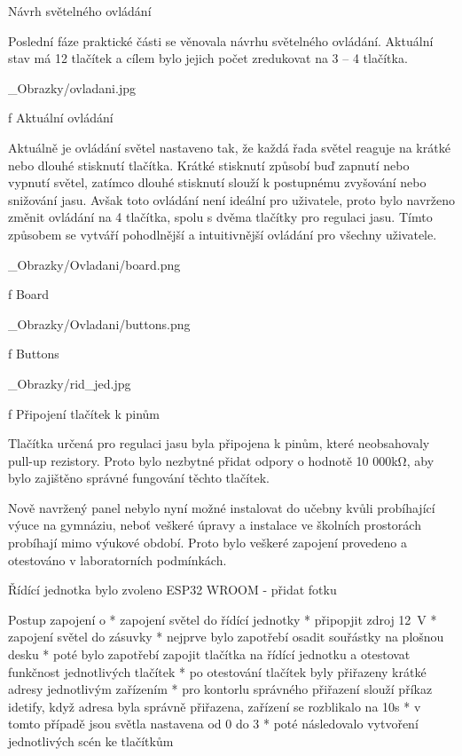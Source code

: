 \chap Návrh světelného ovládání


Poslední fáze praktické části se věnovala návrhu světelného ovládání. Aktuální stav má 12 tlačítek a
cílem bylo jejich počet zredukovat na 3 -- 4 tlačítka.

\medskip {}
\picw=10cm _Obrazky/ovladani.jpg
\caption/f Aktuální ovládání
\medskip


Aktuálně je ovládání světel nastaveno tak, že každá řada světel reaguje na krátké nebo dlouhé stisknutí tlačítka.
Krátké stisknutí způsobí buď zapnutí nebo vypnutí světel, zatímco dlouhé stisknutí slouží k postupnému zvyšování nebo snižování jasu.
Avšak toto ovládání není ideální pro uživatele, proto bylo navrženo změnit ovládání na 4 tlačítka, spolu s dvěma tlačítky pro regulaci jasu.
Tímto způsobem se vytváří pohodlnější a intuitivnější ovládání pro všechny uživatele.

\medskip {}
\picw=10cm _Obrazky/Ovladani/board.png
\caption/f Board
\medskip

\medskip {}
\picw=10cm _Obrazky/Ovladani/buttons.png
\caption/f Buttons
\medskip

\medskip {}
\picw=10cm _Obrazky/rid_jed.jpg
\caption/f Připojení tlačítek k pinům
\medskip


Tlačítka určená pro regulaci jasu byla připojena k pinům, které neobsahovaly pull-up rezistory.
Proto bylo nezbytné přidat odpory o hodnotě 10 000kΩ, aby bylo zajištěno správné fungování těchto tlačítek.

Nově navržený panel nebylo nyní možné instalovat do učebny kvůli probíhající výuce na gymnáziu, neboť veškeré úpravy
a instalace ve školních prostorách probíhají mimo výukové období. Proto bylo veškeré zapojení provedeno a otestováno v laboratorních podmínkách.

\medskip

Řídící jednotka bylo zvoleno ESP32 WROOM - přidat fotku

{\sbf Postup zapojení}
\begitems \style o
* zapojení světel do řídící jednotky
* připopjit zdroj 12~V
* zapojení světel do zásuvky
* nejprve bylo zapotřebí osadit souřástky na plošnou desku
* poté bylo zapotřebí zapojit tlačítka na řídící jednotku a otestovat funkčnost jednotlivých tlačítek
* po otestování tlačítek byly přiřazeny krátké adresy jednotlivým zařízením
* pro kontorlu správného přiřazení slouží příkaz idetify, když adresa byla správně přiřazena, zařízení se rozblikalo na 10s
* v tomto případě jsou světla nastavena od 0 do 3
* poté následovalo vytvoření jednotlivých scén ke tlačítkům
\enditems

